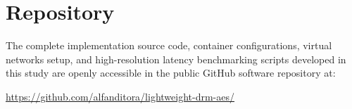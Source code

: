 \section*{Repository}

The complete implementation source code, container configurations, virtual networks setup, and high-resolution latency benchmarking scripts developed in this study are openly accessible in the public GitHub software repository at:

\begin{center}
\underline{\url{https://github.com/alfanditora/lightweight-drm-aes/}}
\end{center}

